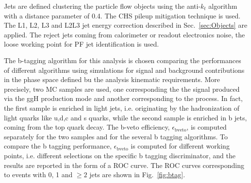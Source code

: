 Jets are defined clustering the particle flow objects using the anti-$k_t$ algorithm with a distance parameter of 0.4. The CHS pileup mitigation technique is used. The L1, L2, L3 and L2L3 jet energy correction described in Sec.~\ref{sec:Objects} are applied. The reject jets coming from calorimeter or readout electronics noise, the loose working point for PF jet identification is used.

The b-tagging algorithm for this analysis is chosen comparing the performances of different algorithms using simulations for signal and background contributions in the phase space defined bu the analysis kinematic requirements. More precisely, two MC samples are used, one corresponding the the \hwwllnn signal produced via the ggH production mode and another corresponding to the \ttbar process. In fact, the first sample is enriched in light jets, i.e. originating by the hadronization of light quarks like u,d,c and s quarks, while the second sample is enriched in b jets, coming from the top quark decay. The b-veto efficiency, $\epsilon_\mathrm{b veto}$, is computed separately for the two samples and for the several b tagging algorithms. To compare the b tagging performance, $\epsilon_\mathrm{b veto}$ is computed for different working points, i.e. different selections on the specific b tagging discriminator, and the results are reported in the form of a ROC curve. The ROC curves corresponding to events with 0, 1 and $\geq 2$ jets are shown in Fig.~\ref{fig:btag}.

